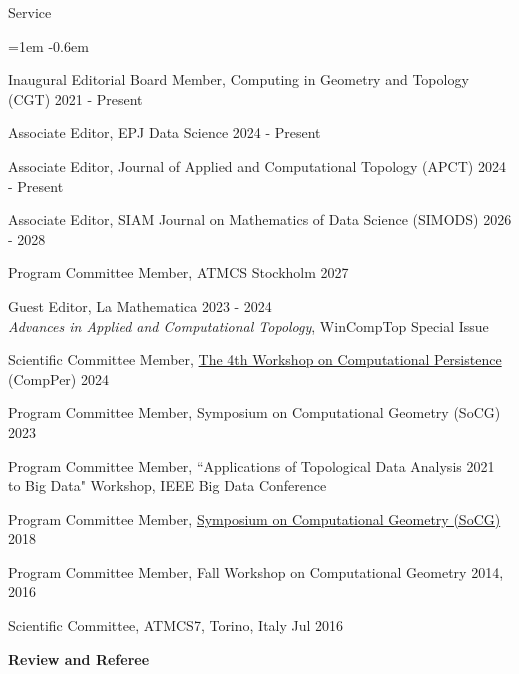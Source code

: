 \documentclass{resume} %
\begin{document}
\begin{rSection}{Service}
\begin{list}{}{\leftmargin=1em}
   \itemsep -0.6em \vspace{-0.5em} %
   \item Inaugural Editorial Board Member, Computing in Geometry and Topology (CGT)  \hfill 2021 - Present
   \item Associate Editor, EPJ Data Science \hfill 2024 - Present
   \item Associate Editor, Journal of Applied and Computational Topology (APCT) \hfill 2024 - Present
   \item Associate Editor, SIAM Journal on Mathematics of Data Science (SIMODS) \hfill 2026 - 2028
\item Program Committee Member, ATMCS Stockholm \hfill 2027
   \item Guest Editor, La Mathematica \hfill 2023 - 2024\\ 
   \phantom{MMM}\textit{Advances in Applied and Computational Topology}, WinCompTop Special Issue 
\item
Scientific Committee Member, \href{https://comper2024.tugraz.at}{The 4th Workshop on Computational Persistence} (CompPer) \hfill 2024
\item
Program Committee Member, Symposium on Computational Geometry (SoCG) \hfill 2023
\item
Program Committee Member, ``Applications of Topological Data Analysis \hfill 2021\\
\phantom{MMM}to Big Data" Workshop, IEEE Big Data Conference
\item
Program Committee Member, \href{https://www.renyi.hu/conferences/socg18/}{Symposium on Computational Geometry (SoCG)} \hfill 2018
\item {Program Committee Member, Fall Workshop on Computational Geometry} \hfill 2014, 2016
\item
{Scientific Committee,
ATMCS7, Torino, Italy} \hfill Jul 2016\\
 \phantom{MMM}{Applied Topology: Methods, Computation, and Science}
\end{list}




\textbf{Review and Referee}


\end{rSection}
\end{document}
